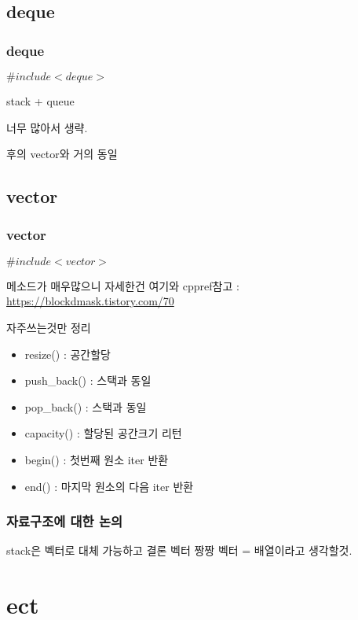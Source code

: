 \documentclass[10pt]{beamer}
\begin{document}
\subsection{deque}

\begin{frame}
    \frametitle{deque}

    $\#include<deque>$
    
    stack  + queue
    
    너무 많아서 생략.

    후의 vector와 거의 동일
\end{frame}


\subsection{vector}


\begin{frame}    
    \frametitle{vector}
    $\#include<vector>$

    메소드가 매우많으니 자세한건 여기와 cppref참고 : \url{https://blockdmask.tistory.com/70}
    
    자주쓰는것만 정리
    
    \begin{itemize}
        \item resize() : 공간할당
        \item push\_back() : 스택과 동일 
        \item pop\_back() : 스택과 동일
        \item capacity() : 할당된 공간크기 리턴 
        \item begin() : 첫번째 원소 iter 반환
        \item end() : 마지막 원소의 다음 iter 반환
    \end{itemize}

\end{frame}


\begin{frame}
    \frametitle{자료구조에 대한 논의}
\end{frame}


\begin{frame}
    stack은 벡터로 대체 가능하고 결론 벡터 짱짱
    벡터 = 배열이라고 생각할것.
    
\end{frame}




 \section{ect}
\end{document}

